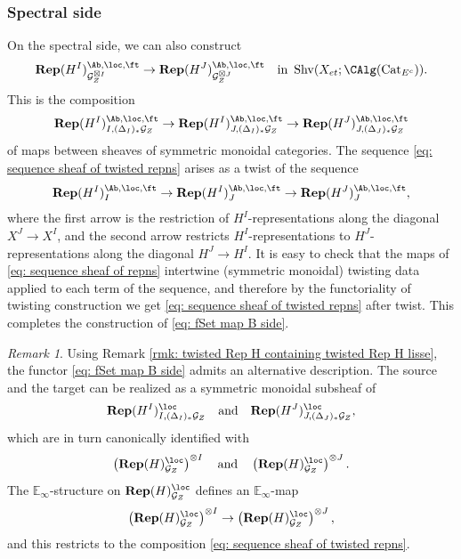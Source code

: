\documentclass[10pt]{amsart}
\newcommand{\sssec}{\subsubsection}
\theoremstyle{remark}
\newtheorem{rmk}[subsubsection]{Remark}
\newcommand{\te}{\text}
\newcommand{\E}{\mathbb{E}}
\newcommand{\on}{\operatorname}
\newcommand{\cG}{\mathcal{G}}
\newcommand{\Cat}{\on{Cat}}
\newcommand{\CatEc}{\Cat_{E^c}}
\newcommand{\Shv}{\on{Shv}}
\begin{document}
\sssec{Spectral side}
On the spectral side, we can also construct 
\begin{equation}\label{eq: fSet map B side}
    \mathbf{Rep}(H^I)^{\Ab,\loc,\ft}_{\cG^{\boxtimes I}_Z}\rightarrow \mathbf{Rep}(H^J)^{\Ab,\loc,\ft}_{\cG^{\boxtimes J}_Z}\quad\te{in }\Shv(X_{et};\CAlg(\CatEc)).
\end{equation}
This is the composition
\begin{equation}\label{eq: sequence sheaf of twisted repns}
    \mathbf{Rep}(H^I)^{\Ab,\loc,\ft}_{I,(\Delta_I)_*\cG_Z}\rightarrow \mathbf{Rep}(H^I)^{\Ab,\loc,\ft}_{J,(\Delta_I)_*\cG_Z}\rightarrow \mathbf{Rep}(H^J)^{\Ab,\loc,\ft}_{J,(\Delta_J)_*\cG_Z}
\end{equation}
of maps between sheaves of symmetric monoidal categories. The sequence \eqref{eq: sequence sheaf of twisted repns} arises as a twist of the sequence
\begin{equation}\label{eq: sequence sheaf of repns}
    \mathbf{Rep}(H^I)^{\Ab,\loc,\ft}_{I}\rightarrow \mathbf{Rep}(H^I)^{\Ab,\loc,\ft}_{J}\rightarrow \mathbf{Rep}(H^J)^{\Ab,\loc,\ft}_{J},
\end{equation}
where the first arrow is the restriction of $H^I$-representations along the diagonal $X^J\rightarrow X^I$, and the second arrow restricts $H^I$-representations to $H^J$-representations along the diagonal $H^J\rightarrow H^I$. It is easy to check that the maps of \eqref{eq: sequence sheaf of repns} intertwine (symmetric monoidal) twisting data applied to each term of the sequence, and therefore by the functoriality of twisting construction we get \eqref{eq: sequence sheaf of twisted repns} after twist. This completes the construction of \eqref{eq: fSet map B side}.

\begin{rmk}
    Using Remark \ref{rmk: twisted Rep H containing twisted Rep H lisse}, the functor \eqref{eq: fSet map B side} admits an alternative description. The source and the target can be realized as a symmetric monoidal subsheaf of
    \[\mathbf{Rep}(H^I)^{\loc}_{I,(\Delta_I)_*\cG_Z}\quad\te{and}\quad \mathbf{Rep}(H^J)^{\loc}_{J,(\Delta_J)_*\cG_Z},\]
    which are in turn canonically identified with
    \[\left(\mathbf{Rep}(H)^{\loc}_{\cG_Z}\right)^{\otimes I}\quad \te{and}\quad \left(\mathbf{Rep}(H)^{\loc}_{\cG_Z}\right)^{\otimes J}.\]
    The $\E_{\infty}$-structure on $\mathbf{Rep}(H)^{\loc}_{\cG_Z}$ defines an $\E_{\infty}$-map
    \[\left(\mathbf{Rep}(H)^{\loc}_{\cG_Z}\right)^{\otimes I}\rightarrow \left(\mathbf{Rep}(H)^{\loc}_{\cG_Z}\right)^{\otimes J},\]
    and this restricts to the composition \eqref{eq: sequence sheaf of twisted repns}.
\end{rmk}
\end{document}
